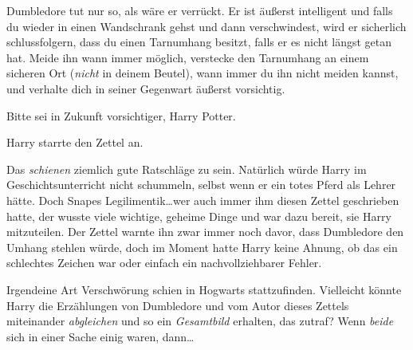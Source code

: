 \begin{writtenNote}
Dumbledore tut nur so, als wäre er verrückt. Er ist äußerst intelligent und falls du wieder in einen Wandschrank gehst und dann verschwindest, wird er sicherlich schlussfolgern, dass du einen Tarnumhang besitzt, falls er es nicht längst getan hat. Meide ihn wann immer möglich, verstecke den Tarnumhang an einem sicheren Ort (\emph{nicht} in deinem Beutel), wann immer du ihn nicht meiden kannst, und verhalte dich in seiner Gegenwart äußerst vorsichtig.

Bitte sei in Zukunft vorsichtiger, Harry Potter.

\end{writtenNote}

Harry starrte den Zettel an.

Das \emph{schienen} ziemlich gute Ratschläge zu sein. Natürlich würde Harry im Geschichtsunterricht nicht schummeln, selbst wenn er ein totes Pferd als Lehrer hätte. Doch Snapes Legilimentik…wer auch immer ihm diesen Zettel geschrieben hatte, der wusste viele wichtige, geheime Dinge und war dazu bereit, sie Harry mitzuteilen. Der Zettel warnte ihn zwar immer noch davor, dass Dumbledore den Umhang stehlen würde, doch im Moment hatte Harry keine Ahnung, ob das ein schlechtes Zeichen war oder einfach ein nachvollziehbarer Fehler.

Irgendeine Art Verschwörung schien in Hogwarts stattzufinden. Vielleicht könnte Harry die Erzählungen von Dumbledore und vom Autor dieses Zettels miteinander \emph{abgleichen} und so ein \emph{Gesamtbild} erhalten, das zutraf? Wenn \emph{beide} sich in einer Sache einig waren, dann…

